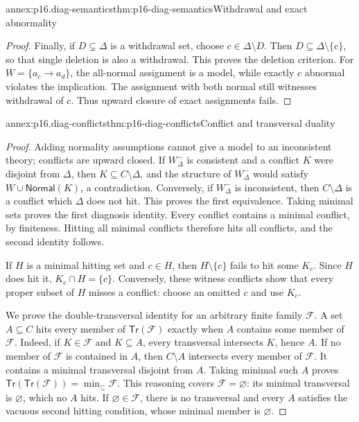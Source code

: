 \begin{annexitem}{annex:p16.diag-semantics}{thm:p16-diag-semantics}{Withdrawal and exact abnormality}
\begin{proof}
Finally, if \(D\subsetneq\Delta\) is a withdrawal set, choose
\(c\in\Delta\setminus D\). Then
\(D\subseteq\Delta\setminus\{c\}\), so that single deletion
is also a withdrawal. This proves the deletion criterion.
For \(W=\{a_c\to a_d\}\), the all-normal assignment is a
model, while exactly \(c\) abnormal violates the implication.
The assignment with both normal still witnesses withdrawal
of \(c\). Thus upward closure of exact assignments fails.
\end{proof}
\end{annexitem}

\begin{annexitem}{annex:p16.diag-conflicts}{thm:p16-diag-conflicts}{Conflict and transversal duality}
\begin{proof}
Adding normality assumptions cannot give a model to an
inconsistent theory; conflicts are upward closed.
If \(W^-_\Delta\) is consistent and a conflict \(K\)
were disjoint from \(\Delta\), then
\(K\subseteq C\setminus\Delta\), and the structure of
\(W^-_\Delta\) would satisfy
\(W\cup\mathsf{Normal}(K)\), a contradiction.
Conversely, if \(W^-_\Delta\) is inconsistent, then
\(C\setminus\Delta\) is a conflict which \(\Delta\)
does not hit. This proves the first equivalence.
Taking minimal sets proves the first diagnosis identity.
Every conflict contains a minimal conflict, by finiteness.
Hitting all minimal conflicts therefore hits all conflicts,
and the second identity follows.

If \(H\) is a minimal hitting set and \(c\in H\), then
\(H\setminus\{c\}\) fails to hit some \(K_c\).
Since \(H\) does hit it, \(K_c\cap H=\{c\}\).
Conversely, these witness conflicts show that every proper
subset of \(H\) misses a conflict: choose an omitted \(c\)
and use \(K_c\).

We prove the double-transversal identity for an arbitrary
finite family \(\mathcal F\). A set \(A\subseteq C\)
hits every member of \(\mathsf{Tr}(\mathcal F)\) exactly
when \(A\) contains some member of \(\mathcal F\).
Indeed, if \(K\in\mathcal F\) and \(K\subseteq A\),
every transversal intersects \(K\), hence \(A\).
If no member of \(\mathcal F\) is contained in \(A\),
then \(C\setminus A\) intersects every member of
\(\mathcal F\). It contains a minimal transversal
disjoint from \(A\). Taking minimal such \(A\) proves
\(\mathsf{Tr}(\mathsf{Tr}(\mathcal F))
=\min_{\subseteq}\mathcal F\).
This reasoning covers \(\mathcal F=\varnothing\):
its minimal transversal is \(\varnothing\), which
no \(A\) hits. If \(\varnothing\in\mathcal F\),
there is no transversal and every \(A\) satisfies the
vacuous second hitting condition, whose minimal member
is \(\varnothing\).
\end{proof}
\end{annexitem}


